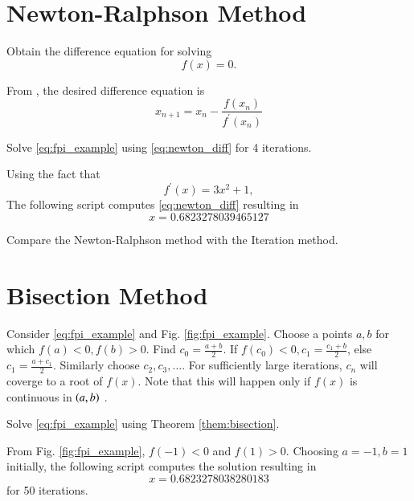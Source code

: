 \documentclass[journal,12pt,twocolumn]{IEEEtran}
\begin{document}
\section{Newton-Ralphson Method}
\begin{problem}
Obtain the difference equation for solving 
%
%
\begin{equation}
\label{eq:newton}
f(x) = 0.
\end{equation}
\end{problem}
\solution From \cite{newton}, the desired difference equation is
%
\begin{equation}
\label{eq:newton_diff}
 x_{n+1}=x_{n}-{\frac {f(x_{n})}{f^{\prime}(x_{n})}}
\end{equation}
%
\begin{problem}
Solve \eqref{eq:fpi_example} using \eqref{eq:newton_diff} for 4 iterations.
\end{problem}
\solution Using the fact that
%
\begin{equation}
f^{\prime}(x) = 3x^2+1,
\end{equation}
%
The following script computes \eqref{eq:newton_diff} resulting in
\begin{equation}
x = 0.6823278039465127
\end{equation}

%
\begin{problem}
Compare the Newton-Ralphson method with the Iteration method.
\section{Bisection Method}
\begin{theorem}
\label{them:bisection}
Consider \eqref{eq:fpi_example} and Fig. \ref{fig:fpi_example}.  Choose a points $a,b$ for which $f(a) < 0, f(b) > 0$.  Find $c_0 = \frac{a+b}{2}$.  If $f(c_0) < 0, c_1 = \frac{c_1+b}{2} $, else $c_1 = \frac{a+ c_1 }{2}$.  Similarly choose $c_2, c_3,\dots$.  For sufficiently large iterations, $c_n$ will coverge to a root of $f(x)$. Note that this will happen only if $f(x)$ is continuous in $\left(a,b\right)$ \cite{bisection}.
\end{theorem}
\end{problem}
%
\begin{problem}
Solve \eqref{eq:fpi_example} using Theorem \ref{them:bisection}.
\end{problem}
\solution From Fig. \ref{fig:fpi_example}, $f(-1) < 0$ and $f(1) > 0$.  Choosing $a = -1, b = 1$ initially,
the following script computes the solution resulting in
\begin{equation}
x = 0.6823278038280183
\end{equation}
for 50 iterations.

%
\end{document}
